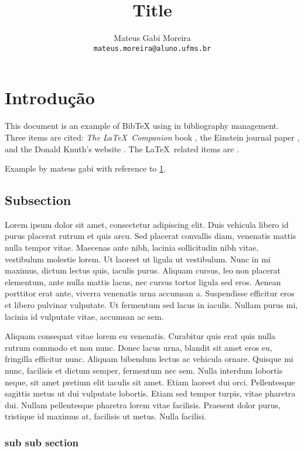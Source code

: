 \documentclass[a4paper,10pt]{article}
\title{Title}
\author{Mateus Gabi Moreira \\
        \texttt{mateus.moreira@aluno.ufms.br}
}
\begin{document}
\maketitle


\section{Introdução} \label{sec}

This document is an example of BibTeX using in bibliography management. Three items are cited: \textit{The \LaTeX\ Companion} book \cite{latexcompanion}, the Einstein journal paper \cite{einstein}, and the Donald Knuth's website \cite{knuthwebsite}. The \LaTeX\ related items are \cite{latexcompanion,knuthwebsite}. 

Example by mateus gabi with reference to \ref{sec}.

\subsection{Subsection}

 Lorem ipsum dolor sit amet, consectetur adipiscing elit. Duis vehicula libero id purus placerat rutrum et quis arcu. Sed placerat convallis diam, venenatis mattis nulla tempor vitae. Maecenas ante nibh, lacinia sollicitudin nibh vitae, vestibulum molestie lorem. Ut laoreet ut ligula ut vestibulum. Nunc in mi maximus, dictum lectus quis, iaculis purus. Aliquam cursus, leo non placerat elementum, ante nulla mattis lacus, nec cursus tortor ligula sed eros. Aenean porttitor erat ante, viverra venenatis urna accumsan a. Suspendisse efficitur eros et libero pulvinar vulputate. Ut fermentum sed lacus in iaculis. Nullam purus mi, lacinia id vulputate vitae, accumsan ac sem.

Aliquam consequat vitae lorem eu venenatis. Curabitur quis erat quis nulla rutrum commodo et non nunc. Donec lacus urna, blandit sit amet eros eu, fringilla efficitur nunc. Aliquam bibendum lectus ac vehicula ornare. Quisque mi nunc, facilisis et dictum semper, fermentum nec sem. Nulla interdum lobortis neque, sit amet pretium elit iaculis sit amet. Etiam laoreet dui orci. Pellentesque sagittis metus ut dui vulputate lobortis. Etiam sed tempor turpis, vitae pharetra dui. Nullam pellentesque pharetra lorem vitae facilisis. Praesent dolor purus, tristique id maximus at, facilisis ut metus. Nulla facilisi. 

\subsubsection{sub sub section}
\end{document}
